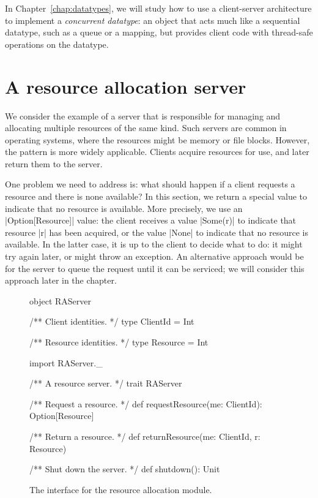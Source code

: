 In Chapter~\ref{chap:datatypes}, we will study how to use a client-server
architecture to implement a \emph{concurrent datatype}: an object that acts
much like a sequential datatype, such as a queue or a mapping, but provides
client code with thread-safe operations on the datatype. 


\section{A resource allocation server}

We consider the example of a server that is responsible for managing and
allocating multiple resources of the same kind.  Such servers are common in
operating systems, where the resources might be memory or file blocks.
However, the pattern is more widely applicable.  Clients acquire resources for
use, and later return them to the server.

One problem we need to address is: what should happen if a client requests a
resource and there is none available?  In this section, we return a special
value to indicate that no resource is available.  More precisely, we use an
|Option[Resource]| value: the client receives a value |Some(r)| to indicate
that resource |r| has been acquired, or the value |None| to indicate that no
resource is available.
%
In the latter case, it is up to the client to decide what to do: it might try
again later, or might throw an exception.  
%
An alternative approach would be for the server to queue the request until it
can be serviced; we will consider this approach later in the chapter.


\begin{figure}
\begin{scala}
object RAServer{
  /** Client identities. */
  type ClientId = Int

  /** Resource identities. */
  type Resource = Int
}

import RAServer._

/** A resource server. */
trait RAServer{
  /** Request a resource. */
  def requestResource(me: ClientId): Option[Resource]

  /** Return a resource. */
  def returnResource(me: ClientId, r: Resource) 

  /** Shut down the server. */
  def shutdown(): Unit
} 
\end{scala}
\caption{The interface for the resource allocation module.}
\label{fig:RAServer}
\end{figure}

